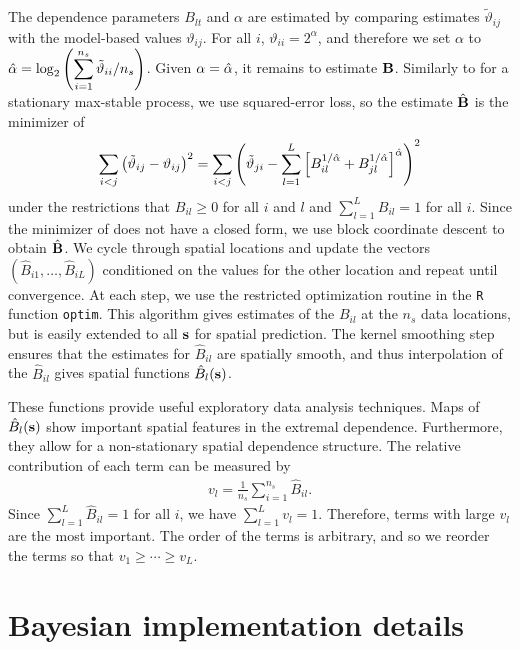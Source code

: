 \documentclass[aoas]{imsart}
\begin{document}
The dependence parameters $B_{lt}$ and $\alpha$ are estimated by comparing estimates ${\tilde \vartheta}_{ij}$ with the model-based values $\vartheta_{ij}$.
For all $i$, $\vartheta_{ii} = 2^{\alpha}$, and therefore we set $\alpha$ to $\hat{\alpha} = \log_2\left(\displaystyle \sum_{i=1}^{n_s}{\tilde \vartheta}_{ii}/n_s\right)$.
Given $\alpha=\hat{\alpha}$, it remains to estimate $\mathbf{B}$.
Similarly to \citet{Smith1990} for a stationary max-stable process, we use squared-error loss, so the estimate $\hat{\mathbf{B}}$ is the minimizer of
\begin{align} \label{ebeq:Bhat}
\sum_{i<j} \left({\tilde \vartheta}_{ij} - \vartheta_{ij}\right)^2
  =
  \sum_{i<j} \left({\tilde \vartheta}_{ji} - \sum_{l=1}^L \left[B_{il}^{1/\alphahat} + B_{jl}^{1/\alphahat} \right]^{\alphahat}\right)^2
\end{align}
under the restrictions that $B_{il}\ge 0$ for all $i$ and $l$ and $\displaystyle \sum_{l=1}^LB_{il}=1$ for all $i$.
Since the minimizer of  does not have a closed form, we use block coordinate descent to obtain ${\hat {\mathbf{B}}}$.
We cycle through spatial locations and update the vectors $\left(\hat{B}_{i1},\ldots,\hat{B}_{iL}\right)$ conditioned on the values for the other location and repeat until convergence.
At each step, we use the restricted optimization routine in the \texttt{R} function \texttt{optim}.
This algorithm gives estimates of the $B_{il}$ at the $n_s$ data locations, but is easily extended to all $\mathbf{s}$ for spatial prediction.
The kernel smoothing step ensures that the estimates for $\hat{B}_{il}$ are spatially smooth, and thus interpolation of the $\hat{B}_{il}$ gives spatial functions $\hat{B}_l(\mathbf{s})$.

These functions provide useful exploratory data analysis techniques.
Maps of $\hat{B}_l(\mathbf{s})$ show important spatial features in the extremal dependence.
Furthermore, they allow for a non-stationary spatial dependence structure.
The relative contribution of each term can be measured by
\begin{align} \label{ebeq:v}
v_l = \frac{1}{n_s}\sum_{i=1}^{n_s}{\hat B}_{il}.
\end{align}
Since $\displaystyle \sum_{l=1}^L{\hat B}_{il}=1$ for all $i$, we have $\displaystyle \sum_{l=1}^Lv_l = 1$.
Therefore, terms with large $v_l$ are the most important.
The order of the terms is arbitrary, and so we reorder the terms so that $v_1\ge \cdots \ge v_L$.

\section{Bayesian implementation details}\label{ebs:MCMC}
\end{document}
